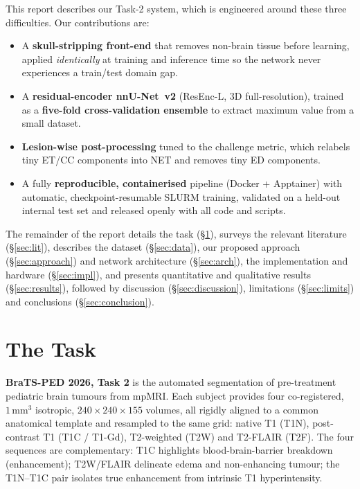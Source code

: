 \documentclass[11pt,a4paper]{article}
\begin{document}
This report describes our Task-2 system, which is engineered around these three
difficulties. Our contributions are:
\begin{itemize}[leftmargin=1.4em,itemsep=2pt]
  \item A \textbf{skull-stripping front-end} that removes non-brain tissue before
        learning, applied \emph{identically} at training and inference time so the
        network never experiences a train/test domain gap.
  \item A \textbf{residual-encoder nnU-Net~v2} (ResEnc-L, 3D full-resolution),
        trained as a \textbf{five-fold cross-validation ensemble} to extract maximum
        value from a small dataset.
  \item \textbf{Lesion-wise post-processing} tuned to the challenge metric, which
        relabels tiny ET/CC components into NET and removes tiny ED components.
  \item A fully \textbf{reproducible, containerised} pipeline (Docker + Apptainer)
        with automatic, checkpoint-resumable SLURM training, validated on a held-out
        internal test set and released openly with all code and scripts.
\end{itemize}
The remainder of the report details the task (\S\ref{sec:task}), surveys the relevant
literature (\S\ref{sec:lit}), describes the dataset (\S\ref{sec:data}), our proposed
approach (\S\ref{sec:approach}) and network architecture (\S\ref{sec:arch}), the
implementation and hardware (\S\ref{sec:impl}), and presents quantitative and
qualitative results (\S\ref{sec:results}), followed by discussion
(\S\ref{sec:discussion}), limitations (\S\ref{sec:limits}) and conclusions
(\S\ref{sec:conclusion}).

\section{The Task}
\label{sec:task}
\textbf{BraTS-PED 2026, Task 2} is the automated segmentation of pre-treatment
pediatric brain tumours from mpMRI. Each subject provides four co-registered,
$1\,\text{mm}^3$ isotropic, $240\times240\times155$ volumes, all rigidly aligned to a
common anatomical template and resampled to the same grid:
native T1 (T1N), post-contrast T1 (T1C / T1-Gd), T2-weighted (T2W) and
T2-FLAIR (T2F). The four sequences are complementary: T1C highlights
blood-brain-barrier breakdown (enhancement); T2W/FLAIR delineate edema and
non-enhancing tumour; the T1N--T1C pair isolates true enhancement from intrinsic
T1 hyperintensity.
\end{document}
